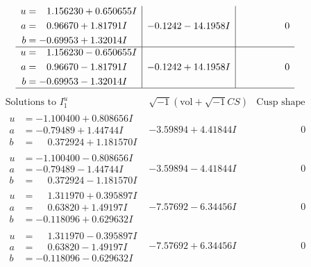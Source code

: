 \documentclass[1p]{elsarticle_modified}
\theoremstyle{definition}
\newcommand{\I}{\sqrt{-1}}
\begin{document}
$$\begin{array}{c|c|c}
\begin{aligned}
u &= \phantom{-}1.156230 + 0.650655 I \\
a &= \phantom{-}0.96670 + 1.81791 I \\
b &= -0.69953 + 1.32014 I\end{aligned}
 & -0.1242 - 14.1958 I & \phantom{-0.000000 } 0 \\ \hline\begin{aligned}
u &= \phantom{-}1.156230 - 0.650655 I \\
a &= \phantom{-}0.96670 - 1.81791 I \\
b &= -0.69953 - 1.32014 I\end{aligned}
 & -0.1242 + 14.1958 I & \phantom{-0.000000 } 0\\
 \hline 
 \end{array}$$\newpage$$\begin{array}{c|c|c}  
\text{Solutions to }I^u_{1}& \I (\text{vol} + \sqrt{-1}CS) & \text{Cusp shape}\\
 \hline 
\begin{aligned}
u &= -1.100400 + 0.808656 I \\
a &= -0.79489 + 1.44744 I \\
b &= \phantom{-}0.372924 + 1.181570 I\end{aligned}
 & -3.59894 + 4.41844 I & \phantom{-0.000000 } 0 \\ \hline\begin{aligned}
u &= -1.100400 - 0.808656 I \\
a &= -0.79489 - 1.44744 I \\
b &= \phantom{-}0.372924 - 1.181570 I\end{aligned}
 & -3.59894 - 4.41844 I & \phantom{-0.000000 } 0 \\ \hline\begin{aligned}
u &= \phantom{-}1.311970 + 0.395897 I \\
a &= \phantom{-}0.63820 + 1.49197 I \\
b &= -0.118096 + 0.629632 I\end{aligned}
 & -7.57692 - 6.34456 I & \phantom{-0.000000 } 0 \\ \hline\begin{aligned}
u &= \phantom{-}1.311970 - 0.395897 I \\
a &= \phantom{-}0.63820 - 1.49197 I \\
b &= -0.118096 - 0.629632 I\end{aligned}
 & -7.57692 + 6.34456 I & \phantom{-0.000000 } 0 \\ \hline\begin{aligned}

\end{aligned}
\end{array}$$
\end{document}
